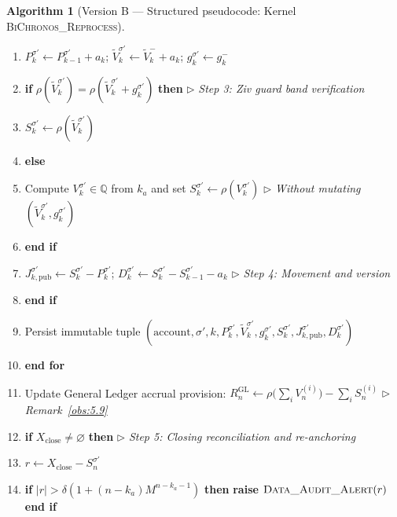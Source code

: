 \documentclass[11pt, a4paper]{article}
\theoremstyle{definition}
\newtheorem{algoritmo}[definicao]{Algorithm}
\theoremstyle{plain}
\theoremstyle{remark}
\begin{document}
\begin{algoritmo}[Version B — Structured pseudocode: Kernel \textsc{BiChronos\_Reprocess}]
\begin{enumerate}[label=\footnotesize\textbf{\arabic*:}, leftmargin=2.2em, itemsep=0.15em, topsep=0.3em]
    \item \hspace{2.4em} $P_k^{\sigma'} \leftarrow P_{k-1}^{\sigma'} + a_k$; \quad $\tilde{V}_k^{\sigma'} \leftarrow \tilde{V}_k^- + a_k$; \quad $g_k^{\sigma'} \leftarrow g_k^-$
    \item \hspace{2.4em} \textbf{if} $\rho(\tilde{V}_k^{\sigma'}) = \rho(\tilde{V}_k^{\sigma'} + g_k^{\sigma'})$ \textbf{then} \hfill $\triangleright$ \emph{Step 3: Ziv guard band verification}
    \item \hspace{3.6em} $S_k^{\sigma'} \leftarrow \rho(\tilde{V}_k^{\sigma'})$
    \item \hspace{2.4em} \textbf{else}
    \item \hspace{3.6em} Compute $V_k^{\sigma'} \in \mathbb{Q}$ from $k_a$ and set $S_k^{\sigma'} \leftarrow \rho(V_k^{\sigma'})$ \hfill $\triangleright$ \emph{Without mutating $(\tilde{V}_k^{\sigma'}, g_k^{\sigma'})$}
    \item \hspace{2.4em} \textbf{end if}
    \item \hspace{2.4em} $J_{k,\text{pub}}^{\sigma'} \leftarrow S_k^{\sigma'} - P_k^{\sigma'}$; \quad $D_k^{\sigma'} \leftarrow S_k^{\sigma'} - S_{k-1}^{\sigma'} - a_k$ \hfill $\triangleright$ \emph{Step 4: Movement and version}
    \item \hspace{1.2em} \textbf{end if}
    \item \hspace{1.2em} Persist immutable tuple $(\text{account}, \sigma', k, P_k^{\sigma'}, \tilde{V}_k^{\sigma'}, g_k^{\sigma'}, S_k^{\sigma'}, J_{k,\text{pub}}^{\sigma'}, D_k^{\sigma'})$
    \item \textbf{end for}
    \item Update General Ledger accrual provision: $R_n^{\text{GL}} \leftarrow \rho\big(\sum_i V_n^{(i)}\big) - \sum_i S_n^{(i)}$ \hfill $\triangleright$ \emph{Remark~\ref{obs:5.9}}
    \item \textbf{if} $X_{\text{close}} \neq \varnothing$ \textbf{then} \hfill $\triangleright$ \emph{Step 5: Closing reconciliation and re-anchoring}
    \item \hspace{1.2em} $r \leftarrow X_{\text{close}} - S_n^{\sigma'}$
    \item \hspace{1.2em} \textbf{if} $|r| > \delta(1 + (n - k_a)M^{n - k_a - 1})$ \textbf{then} \textbf{raise} $\textsc{Data\_Audit\_Alert}(r)$ \textbf{end if}

\end{enumerate}
\end{algoritmo}
\end{document}
